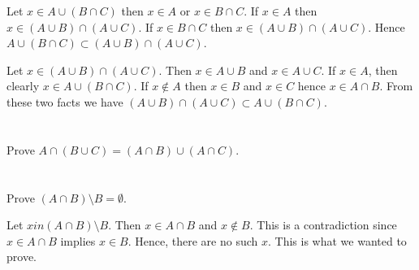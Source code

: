\documentclass[a4paper]{article}
\begin{document}
Let $x \in A \cup (B \cap C)$ then $x \in A$ or $x \in B \cap C$. If $x \in A$ then $x \in (A \cup B) \cap (A \cup C)$. If $x \in B \cap C$ then $x \in (A \cup B) \cap (A \cup C)$. Hence $A \cup (B \cap C) \subset (A \cup B) \cap (A \cup C)$. 

\vspace{\baselineskip}

Let $x \in (A \cup B) \cap (A \cup C)$. Then $x \in A \cup B$ and $x \in A \cup C$. If $x \in A$, then clearly $x \in A \cup (B \cap C)$. If $x \not\in A$ then $x \in B$ and $x \in C$ hence $x \in A \cap B$. From these two facts we have  $(A \cup B) \cap (A \cup C) \subset A \cup (B \cap C)$.


\section{}

Prove $A \cap (B \cup C) = (A \cap B) \cup (A \cap C)$.


\section{}


\section{}


\section{}


\section{}


\section{}

Prove $(A \cap B) \setminus B = \emptyset$.

\vspace{\baselineskip}

Let $ x in (A \cap B) \setminus B$. Then $x \in A \cap B$ and $x \not\in B$. This is a contradiction since $x \in A \cap B$ implies $x \in B$. Hence, there are no such $x$. This is what we wanted to prove.
\end{document}
